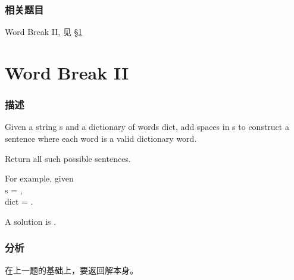 \subsubsection{相关题目}
\begindot
\item Word Break II, 见 \S \ref{sec:word-break-ii}
\myenddot


\section{Word Break II} %
\label{sec:word-break-ii}


\subsubsection{描述}
Given a string s and a dictionary of words dict, add spaces in s to construct a sentence where each word is a valid dictionary word.

Return all such possible sentences.

For example, given  \\
s = , \\
dict = .

A solution is .


\subsubsection{分析}
在上一题的基础上，要返回解本身。



